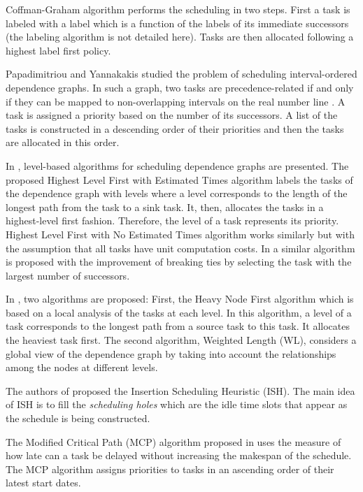 Coffman-Graham algorithm \cite{coffman:1972} performs the scheduling in two steps. First a task is labeled with a label which is a function of the labels of its immediate successors (the labeling algorithm is not detailed here). Tasks are then allocated following a highest label first policy. 

Papadimitriou and Yannakakis \cite{papadimitriou:1979} studied the problem of scheduling interval-ordered dependence graphs. In such a graph, two tasks are precedence-related if and only if they can be mapped to non-overlapping intervals on the real number line \cite{fishburn:1985}. A task is assigned a priority based on the number of its successors. A list of the tasks is constructed in a descending order of their priorities and then the tasks are allocated in this order. 

In \cite{adam:1974}, level-based algorithms for scheduling dependence graphs are presented. The proposed Highest Level First with Estimated Times algorithm labels the tasks of the dependence graph with levels where a level corresponds to the length of  the longest path from the task to a sink task. It, then, allocates the tasks in a highest-level first fashion. Therefore, the level of a task represents its priority. Highest Level First with No Estimated Times algorithm works similarly but with the assumption that all tasks have unit computation costs. In \cite{kasahara:1984} a similar algorithm is proposed with the improvement of breaking ties by selecting the task with the largest number of successors. 

In \cite{shirazi:1990}, two algorithms are proposed: First, the Heavy Node First algorithm which is based on a local analysis of the tasks at each level. In this algorithm, a level of a task corresponds to the longest path from a source task to this task. It allocates the heaviest task first. The second algorithm, Weighted Length (WL), considers a global view of the dependence graph by taking into account the relationships among the nodes at different levels. 

The authors of \cite{kruatrachue:1987} proposed the Insertion Scheduling Heuristic (ISH). The main idea of ISH is to fill the \textit{scheduling holes} which are the idle time slots that appear as the schedule is being constructed.

The Modified Critical Path (MCP) algorithm proposed in \cite{wu:1990} uses the measure of how late can a task be delayed without increasing the makespan of the schedule. The MCP algorithm assigns priorities to tasks in an ascending order of their latest start dates. 

